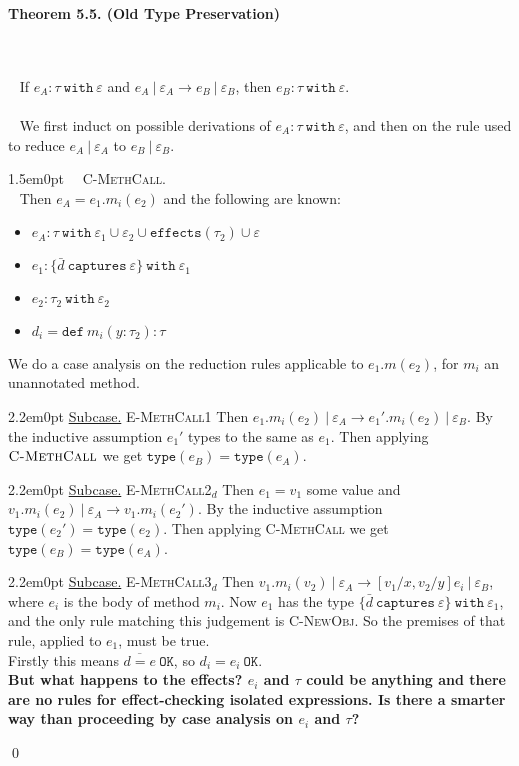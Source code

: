 \documentclass{llncs}
\newcommand{\keywadj}[1]{\mathtt{#1}}
\newcommand{\keyw}[1]{\keywadj{#1}~}
\newcommand{\thm}[3]{
	\begin{large}
		\bf{#1}
	\end{large} \\\\
	\fbox{Statement.} ~ #2
	\fbox{Proof.}~ #3 \qed
}
\newcommand{\proofcase}[2]{
	\begin{adjustwidth}{1.5em}{0pt}
		\fbox{Case.}~~#1. \\ ~#2
	\end{adjustwidth}
}
\newcommand{\subcase}[1] {
	\begin{adjustwidth}{2.2em}{0pt}
		\underline{Subcase.} #1
	\end{adjustwidth}
}
\begin{document}
\thm{Theorem 5.5. (Old Type Preservation)}
{If $e_A : \tau~\keyw{with} \varepsilon$ and $e_A~|~\varepsilon_A \longrightarrow e_B~|~\varepsilon_B$, then $e_B : \tau~\keyw{with} \varepsilon$. \\\\}
{We first induct on possible derivations of $e_A : \tau ~\keyw{with} \varepsilon$, and then on the rule used to reduce $e_A~|~\varepsilon_A$ to $e_B~|~\varepsilon_B$.\\

	\proofcase{\textsc{C-MethCall}} { Then $e_A = e_1.m_i(e_2)$ and the following are known:
	\begin{itemize}
		\item $e_A : \tau~\keyw{with} \varepsilon_1 \cup \varepsilon_2 \cup \keywadj{effects}(\tau_2) \cup \varepsilon$
		\item $e_1 : \{ \bar d~\keyw{captures} \varepsilon \}~\keyw{with} \varepsilon_1$
		\item $e_2 : \tau_2~\keyw{with} \varepsilon_2$
		\item $d_i = \keyw{def} m_i(y : \tau_2) : \tau$
	\end{itemize}
	
	We do a case analysis on the reduction rules applicable to $e_1.m(e_2)$, for $m_i$ an unannotated method.
	
	\subcase{ \textsc{E-MethCall1}
		Then $e_1.m_i(e_2)~|~\varepsilon_A \longrightarrow e_1'.m_i(e_2)~|~\varepsilon_B$. By the inductive assumption $e_1'$ types to the same as $e_1$. Then applying $\textsc{C-MethCall}$ we get $\keywadj{type}(e_B) = \keywadj{type}(e_A)$.
	}
	
	\subcase{ \textsc{E-MethCall2$_d$}
		Then $e_1 = v_1$ some value and $v_1.m_i(e_2)~|~\varepsilon_A \longrightarrow v_1.m_i(e_2')$. By the inductive assumption $\keywadj{type}(e_2') = \keywadj{type}(e_2)$. Then applying \textsc{C-MethCall} we get $\keywadj{type}(e_B) = \keywadj{type}(e_A)$.
	}		
	
	\subcase{ \textsc{E-MethCall3$_d$} Then $v_1.m_i(v_2)~|~\varepsilon_A \longrightarrow [v_1/x, v_2/y]e_i~|~\varepsilon_B$, where $e_i$ is the body of method $m_i$. Now $e_1$ has the type $\{ \bar d~\keyw{captures} \varepsilon \}~\keyw{with} \varepsilon_1$, and the only rule matching this judgement is \textsc{C-NewObj}. So the premises of that rule, applied to $e_1$, must be true.
	\\ \noindent
Firstly this means $\overline{d = e}~\keywadj{OK}$, so $d_i = e_i~\keywadj{OK}$.
	\\ \noindent
\textbf{But what happens to the effects? $e_i$ and $\tau$ could be anything and there are no rules for effect-checking isolated expressions. Is there a smarter way than proceeding by case analysis on $e_i$ and $\tau$?}
}
		
	}
}
\end{document}
